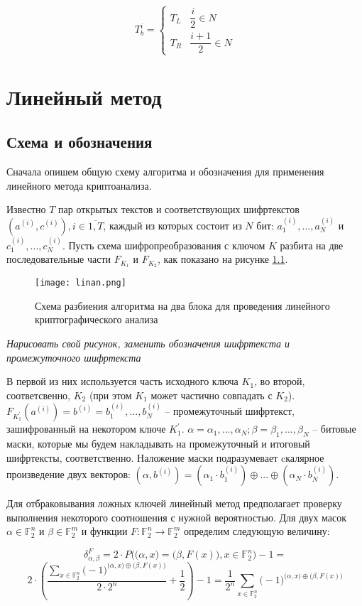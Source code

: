 \documentclass[utf8x, 14pt]{G7-32} %
\begin{document}
$$ T_b^i =
\begin{cases}
T_L & \dfrac{i}{2} \in N \\
T_R & \dfrac{i+1}{2} \in N
\end{cases} $$

\chapter{Линейный метод}
\section{Схема и обозначения}
Сначала опишем общую схему алгоритма и обозначения для применения линейного метода криптоанализа.

Известно $T$ пар открытых текстов и соответствующих шифртекстов $(a^{(i)}, c^{(i)}), i\in\overline{1,T}$, каждый из которых состоит из $N$ бит: $a_1^{(i)}, ..., a_N^{(i)}$ и $c_1^{(i)}, ..., c_N^{(i)}$. Пусть схема шифропреобразования с ключом $K$ разбита на две последовательные части $F_{K_1}$ и $F_{K_2}$, как показано на рисунке \ref{fig:linan}. 
\begin{figure}[h!]
	\centering
	\texttt{[image: linan.png]}
	\caption{Схема разбиения алгоритма на два блока для проведения линейного криптографического анализа}
	\label{fig:linan}
\end{figure}
\textit{Нарисовать свой рисунок, заменить обозначения шифртекста и промежуточного шифртекста}

В первой из них используется часть исходного ключа $K_1$, во второй, соответсвенно, $K_2$ (при этом $K_1$ может частично совпадать с $K_2$). $F_{K_1^{'}}(a^{(i)}) = b^{(i)} = b_1^{(i)}, ..., b_N^{(i)}$ -- промежуточный шифртекст, зашифрованный на некотором ключе $K_1^{'}$. $\alpha = \alpha_1, ..., \alpha_N; \beta = \beta_1, ..., \beta_N$ -- битовые маски, которые мы будем накладывать на промежуточный и итоговый шифртексты, соответственно. Наложение маски подразумевает cкалярное произведение двух векторов: $(\alpha, b^{(i)}) = (\alpha_1 \cdot b_1^{(i)}) \oplus ... \oplus (\alpha_N \cdot b_N^{(i)})$.

Для отбраковывания ложных ключей линейный метод предполагает проверку выполнения некоторого соотношения с нужной вероятностью. Для двух масок $\alpha \in \mathbb{F}_2^n$ и $\beta \in \mathbb{F}_2^m$ и функции $F :\mathbb{F}_2^n \to \mathbb{F}_2^m$ определим следующую величину:

$$ \delta_{\alpha, \beta}^{F} = 2\cdot P\Big( \big(\alpha, x\big) = \big(\beta, F(x)\big), x\in \mathbb{F}_2^n\Big) - 1 = $$
$$ 2\cdot \left(\dfrac{\sum_{x\in \mathbb{F}_2^n} \big(-1\big)^{\big(\alpha, x\big) \oplus \big(\beta, F(x)\big)}}{2 \cdot 2^n} + \dfrac{1}{2}\right)  - 1 = \dfrac{1}{2^n} \sum_{x\in \mathbb{F}_2^n} \big(-1\big)^{\big(\alpha, x\big) \oplus \big(\beta, F(x)\big)}$$
\end{document}
